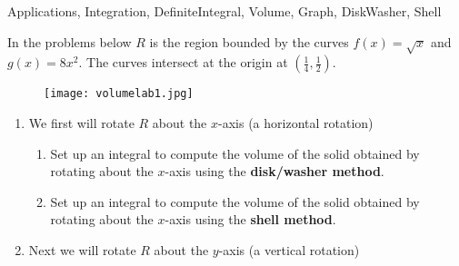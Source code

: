 \begin{tagblock}{Applications, Integration, DefiniteIntegral, Volume, Graph, DiskWasher, Shell}
\begin{question}
	


In the problems below $R$ is the region bounded by the curves $f(x) =\sqrt{x}$ and $g(x) = 8x^2$.  The curves intersect at the origin at $(\frac{1}{4}, \frac{1}{2})$.  


\begin{figure}[h]
\centering
\texttt{[image: volumelab1.jpg]}
\end{figure}




\begin{enumerate}
\item  We first will rotate $R$ about the $x$-axis (a horizontal rotation)

\begin{enumerate}
\item Set up an integral to compute the volume of the solid obtained by rotating about the $x$-axis using the \textbf{disk/washer method}.
\vspace{1in}
\item Set up an integral to compute the volume of the solid obtained by rotating about the $x$-axis using the \textbf{shell method}.
\vspace{.8in}
\end{enumerate}

\item  Next we will rotate $R$ about the $y$-axis (a vertical rotation)


\end{enumerate}
\end{question}
\end{tagblock}
